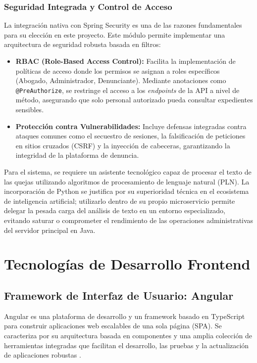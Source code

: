 \subsubsection{Seguridad Integrada y Control de Acceso}

La integración nativa con Spring Security es una de las razones fundamentales para su elección en este proyecto. Este módulo permite implementar una arquitectura de seguridad robusta basada en filtros:
\begin{itemize}
\item \textbf{RBAC (Role-Based Access Control):} Facilita la implementación de políticas de acceso donde los permisos se asignan a roles específicos (Abogado, Administrador, Denunciante). Mediante anotaciones como \texttt{@PreAuthorize}, se restringe el acceso a los \textit{endpoints} de la API a nivel de método, asegurando que solo personal autorizado pueda consultar expedientes sensibles.
\item \textbf{Protección contra Vulnerabilidades:} Incluye defensas integradas contra ataques comunes como el secuestro de sesiones, la falsificación de peticiones en sitios cruzados (CSRF) y la inyección de cabeceras, garantizando la integridad de la plataforma de denuncia.
\end{itemize}

Para el sistema, se requiere un asistente tecnológico capaz de procesar el texto de las quejas utilizando algoritmos de procesamiento de lenguaje natural (PLN). La incorporación de Python se justifica por su superioridad técnica en el ecosistema de inteligencia artificial; utilizarlo dentro de su propio microservicio permite delegar la pesada carga del análisis de texto en un entorno especializado, evitando saturar o comprometer el rendimiento de las operaciones administrativas del servidor principal en Java.
\section{Tecnologías de Desarrollo Frontend}
\subsection{Framework de Interfaz de Usuario: Angular}
Angular es una plataforma de desarrollo y un framework basado en TypeScript para construir aplicaciones web escalables de una sola página (SPA). Se caracteriza por su arquitectura basada en componentes y una amplia colección de herramientas integradas que facilitan el desarrollo, las pruebas y la actualización de aplicaciones robustas \cite{41} .

